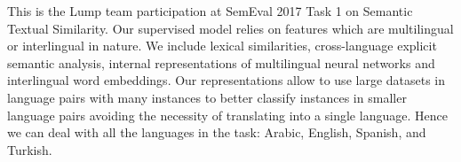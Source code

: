 This is the Lump team participation at SemEval 2017 Task 1 on Semantic Textual Similarity. Our supervised model relies on features which are multilingual or interlingual in nature. We include lexical similarities, cross-language explicit semantic analysis, internal representations of multilingual neural networks and interlingual word embeddings. Our representations allow to use large datasets in language pairs with many instances to better classify instances in smaller language pairs avoiding the necessity of translating into a single language. Hence we can deal with all the languages in the task: Arabic, English, Spanish, and Turkish.
